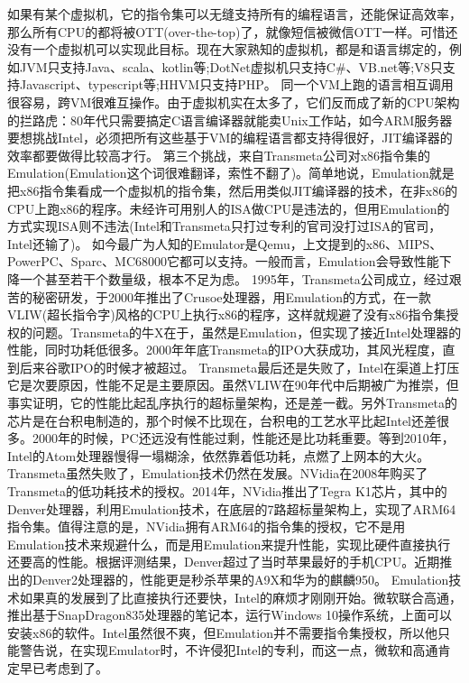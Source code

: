 \documentclass[utf8]{book}
\begin{document}
	如果有某个虚拟机，它的指令集可以无缝支持所有的编程语言，还能保证高效率，那么所有CPU的都将被OTT(over-the-top)了，就像短信被微信OTT一样。可惜还没有一个虚拟机可以实现此目标。现在大家熟知的虚拟机，都是和语言绑定的，例如JVM只支持Java、scala、kotlin等;DotNet虚拟机只支持C\#、VB.net等;V8只支持Javascript、typescript等;HHVM只支持PHP。
	同一个VM上跑的语言相互调用很容易，跨VM很难互操作。由于虚拟机实在太多了，它们反而成了新的CPU架构的拦路虎：80年代只需要搞定C语言编译器就能卖Unix工作站，如今ARM服务器要想挑战Intel，必须把所有这些基于VM的编程语言都支持得很好，JIT编译器的效率都要做得比较高才行。
	第三个挑战，来自Transmeta公司对x86指令集的Emulation(Emulation这个词很难翻译，索性不翻了)。简单地说，Emulation就是把x86指令集看成一个虚拟机的指令集，然后用类似JIT编译器的技术，在非x86的CPU上跑x86的程序。未经许可用别人的ISA做CPU是违法的，但用Emulation的方式实现ISA则不违法(Intel和Transmeta只打过专利的官司没打过ISA的官司，Intel还输了)。
	如今最广为人知的Emulator是Qemu，上文提到的x86、MIPS、PowerPC、Sparc、MC68000它都可以支持。一般而言，Emulation会导致性能下降一个甚至若干个数量级，根本不足为虑。
	1995年，Transmeta公司成立，经过艰苦的秘密研发，于2000年推出了Crusoe处理器，用Emulation的方式，在一款VLIW(超长指令字)风格的CPU上执行x86的程序，这样就规避了没有x86指令集授权的问题。Transmeta的牛X在于，虽然是Emulation，但实现了接近Intel处理器的性能，同时功耗低很多。2000年年底Transmeta的IPO大获成功，其风光程度，直到后来谷歌IPO的时候才被超过。
	Transmeta最后还是失败了，Intel在渠道上打压它是次要原因，性能不足是主要原因。虽然VLIW在90年代中后期被广为推崇，但事实证明，它的性能比起乱序执行的超标量架构，还是差一截。另外Transmeta的芯片是在台积电制造的，那个时候不比现在，台积电的工艺水平比起Intel还差很多。2000年的时候，PC还远没有性能过剩，性能还是比功耗重要。等到2010年，Intel的Atom处理器慢得一塌糊涂，依然靠着低功耗，点燃了上网本的大火。
	Transmeta虽然失败了，Emulation技术仍然在发展。NVidia在2008年购买了Transmeta的低功耗技术的授权。2014年，NVidia推出了Tegra K1芯片，其中的Denver处理器，利用Emulation技术，在底层的7路超标量架构上，实现了ARM64指令集。值得注意的是，NVidia拥有ARM64的指令集的授权，它不是用Emulation技术来规避什么，而是用Emulation来提升性能，实现比硬件直接执行还要高的性能。根据评测结果，Denver超过了当时苹果最好的手机CPU。近期推出的Denver2处理器的，性能更是秒杀苹果的A9X和华为的麒麟950。
	Emulation技术如果真的发展到了比直接执行还要快，Intel的麻烦才刚刚开始。微软联合高通，推出基于SnapDragon835处理器的笔记本，运行Windows 10操作系统，上面可以安装x86的软件。Intel虽然很不爽，但Emulation并不需要指令集授权，所以他只能警告说，在实现Emulator时，不许侵犯Intel的专利，而这一点，微软和高通肯定早已考虑到了。
	
\end{document}
